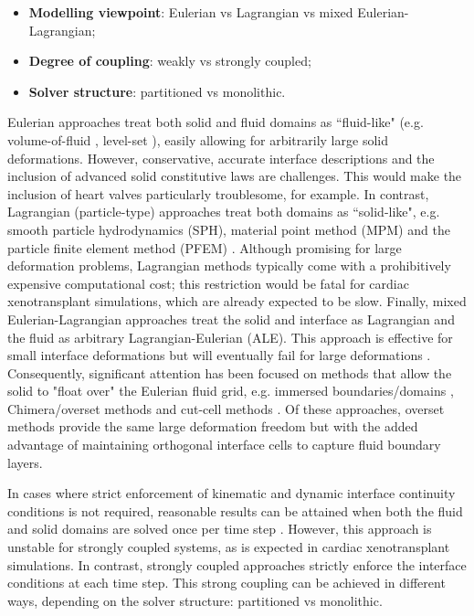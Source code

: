 \documentclass[sn-mathphys,Numbered]{sn-jnl}%
\begin{document}
\begin{itemize}
	\item \textbf{Modelling viewpoint}: Eulerian vs Lagrangian vs mixed Eulerian-Lagrangian;
	\item \textbf{Degree of coupling}: weakly vs strongly coupled;
	\item \textbf{Solver structure}: partitioned vs monolithic.
\end{itemize}

Eulerian approaches treat both solid and fluid domains as ``fluid-like" (e.g. volume-of-fluid \citep{jain2019conservative}, level-set \citep{dunne2006eulerian, cottet2008eulerian}), easily allowing for arbitrarily large solid deformations. However, conservative, accurate interface descriptions and the inclusion of advanced solid constitutive laws are challenges. This would make the inclusion of heart valves particularly troublesome, for example. In contrast, Lagrangian (particle-type) approaches treat both domains as ``solid-like", e.g. smooth particle hydrodynamics (SPH), material point method (MPM) and the particle finite element method (PFEM) \citep{aubry2005particle, aubry2006fractional, cremonesi2020state}. Although promising for large deformation problems, Lagrangian methods typically come with a prohibitively expensive computational cost; this restriction would be fatal for cardiac xenotransplant simulations, which are already expected to be slow. Finally, mixed Eulerian-Lagrangian approaches treat the solid and interface as Lagrangian and the fluid as arbitrary Lagrangian-Eulerian (ALE). This approach is effective for small interface deformations but will eventually fail for large deformations \citep{wall2006large}. Consequently, significant attention has been focused on methods that allow the solid to "float over" the Eulerian fluid grid, e.g. immersed boundaries/domains \citep{peskin1977numerical, peskin2002immersed, iaccarino2003immersed}, Chimera/overset methods \citep{ge2003three, miller2014overset, li2021fluid, cane2021patient} and cut-cell methods \citep{pasquariello2016cut, tao2020new, xie2020cartesian}. Of these approaches, overset methods provide the same large deformation freedom but with the added advantage of maintaining orthogonal interface cells to capture fluid boundary layers.

In cases where strict enforcement of kinematic and dynamic interface continuity conditions is not required, reasonable results can be attained when both the fluid and solid domains are solved once per time step \citep{farhat2000two}. However, this approach is unstable for strongly coupled systems, as is expected in cardiac xenotransplant simulations. In contrast, strongly coupled approaches strictly enforce the interface conditions at each time step. This strong coupling can be achieved in different ways, depending on the solver structure: partitioned vs monolithic.
\end{document}
